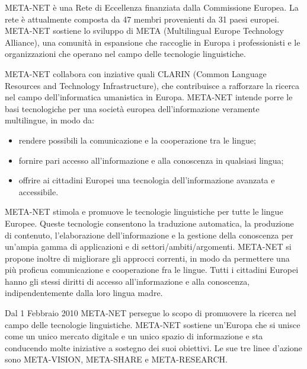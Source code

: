 \documentclass[]{../../metanetpaper}
\begin{document}
\begin{multicols}{2}

META-NET \`{e} una Rete di Eccellenza finanziata dalla Commissione Europea. La rete \`{e} attualmente composta da 47 membri provenienti da 31 paesi europei. META-NET sostiene lo sviluppo di META (Multilingual Europe Technology Alliance), una comunit\`{a} in espansione che raccoglie in Europa i professionisti e le organizzazioni che operano nel campo delle tecnologie linguistiche.

META-NET collabora con inziative quali CLARIN (Common Language Resources and Technology Infrastructure), che contribuisce a rafforzare la ricerca nel campo dell'informatica umanistica in Europa. META-NET intende porre le basi tecnologiche per una societ\`{a} europea dell'informazione veramente multilingue, in modo da:


\begin{itemize}
\item rendere possibili la comunicazione e la cooperazione tra le lingue;
\item fornire pari accesso all'informazione e alla conoscenza in qualsiasi lingua;
\item offrire ai cittadini Europei una tecnologia dell'informazione avanzata e accessibile.
\end{itemize}

META-NET stimola e promuove le tecnologie linguistiche per tutte le lingue Europee. Queste tecnologie consentono la traduzione automatica, la produzione di contenuto, l'elaborazione dell'informazione e la gestione della conoscenza per un'ampia gamma di applicazioni e di settori/ambiti/argomenti. META-NET si propone inoltre di migliorare gli approcci correnti, in modo da permettere una pi\`{u} proficua comunicazione e cooperazione fra le lingue. Tutti i cittadini Europei hanno gli stessi diritti di accesso all'informazione e alla conoscenza, indipendentemente dalla loro lingua madre.

Dal 1 Febbraio 2010 META-NET persegue lo scopo di promuovere la ricerca nel campo delle tecnologie linguistiche. META-NET sostiene un'Europa che si unisce come un unico mercato digitale e un unico spazio di informazione e sta conducendo molte iniziative a sostegno dei suoi obiettivi. Le sue tre linee d'azione sono META-VISION, META-SHARE e META-RESEARCH.



\end{multicols}
\end{document}
